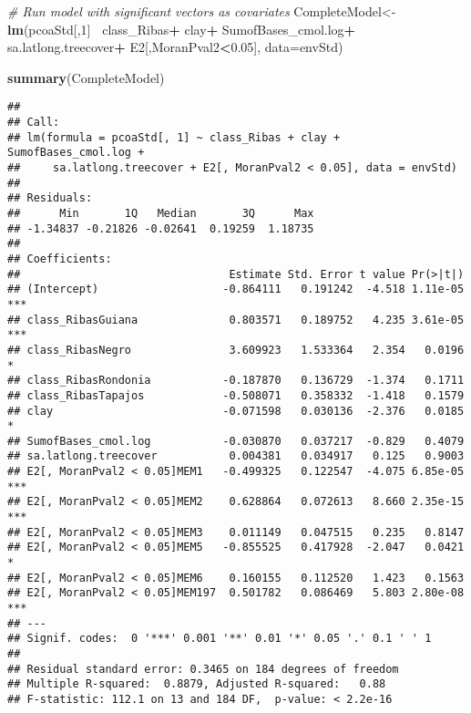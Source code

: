 \documentclass[]{article}
\newenvironment{Shaded}{\begin{snugshade}}{\end{snugshade}}
\newcommand{\CommentTok}[1]{\textcolor[rgb]{0.56,0.35,0.01}{\textit{#1}}}
\newcommand{\DataTypeTok}[1]{\textcolor[rgb]{0.13,0.29,0.53}{#1}}
\newcommand{\DecValTok}[1]{\textcolor[rgb]{0.00,0.00,0.81}{#1}}
\newcommand{\FloatTok}[1]{\textcolor[rgb]{0.00,0.00,0.81}{#1}}
\newcommand{\KeywordTok}[1]{\textcolor[rgb]{0.13,0.29,0.53}{\textbf{#1}}}
\newcommand{\NormalTok}[1]{#1}
\newcommand{\OperatorTok}[1]{\textcolor[rgb]{0.81,0.36,0.00}{\textbf{#1}}}
\newcommand{\StringTok}[1]{\textcolor[rgb]{0.31,0.60,0.02}{#1}}
\begin{document}
\begin{Shaded}
\begin{Highlighting}[]
\CommentTok{# Run model with significant vectors as covariates}
\NormalTok{CompleteModel<-}\KeywordTok{lm}\NormalTok{(pcoaStd[,}\DecValTok{1}\NormalTok{]}\OperatorTok{~}
\StringTok{                    }\NormalTok{class_Ribas}\OperatorTok{+}
\StringTok{                    }\NormalTok{clay}\OperatorTok{+}
\StringTok{                    }\NormalTok{SumofBases_cmol.log}\OperatorTok{+}
\StringTok{                    }\NormalTok{sa.latlong.treecover}\OperatorTok{+}
\StringTok{                    }\NormalTok{E2[,MoranPval2}\OperatorTok{<}\FloatTok{0.05}\NormalTok{],}
                  \DataTypeTok{data=}\NormalTok{envStd)}

\KeywordTok{summary}\NormalTok{(CompleteModel)}
\end{Highlighting}
\end{Shaded}

\begin{verbatim}
## 
## Call:
## lm(formula = pcoaStd[, 1] ~ class_Ribas + clay + SumofBases_cmol.log + 
##     sa.latlong.treecover + E2[, MoranPval2 < 0.05], data = envStd)
## 
## Residuals:
##      Min       1Q   Median       3Q      Max 
## -1.34837 -0.21826 -0.02641  0.19259  1.18735 
## 
## Coefficients:
##                                Estimate Std. Error t value Pr(>|t|)    
## (Intercept)                   -0.864111   0.191242  -4.518 1.11e-05 ***
## class_RibasGuiana              0.803571   0.189752   4.235 3.61e-05 ***
## class_RibasNegro               3.609923   1.533364   2.354   0.0196 *  
## class_RibasRondonia           -0.187870   0.136729  -1.374   0.1711    
## class_RibasTapajos            -0.508071   0.358332  -1.418   0.1579    
## clay                          -0.071598   0.030136  -2.376   0.0185 *  
## SumofBases_cmol.log           -0.030870   0.037217  -0.829   0.4079    
## sa.latlong.treecover           0.004381   0.034917   0.125   0.9003    
## E2[, MoranPval2 < 0.05]MEM1   -0.499325   0.122547  -4.075 6.85e-05 ***
## E2[, MoranPval2 < 0.05]MEM2    0.628864   0.072613   8.660 2.35e-15 ***
## E2[, MoranPval2 < 0.05]MEM3    0.011149   0.047515   0.235   0.8147    
## E2[, MoranPval2 < 0.05]MEM5   -0.855525   0.417928  -2.047   0.0421 *  
## E2[, MoranPval2 < 0.05]MEM6    0.160155   0.112520   1.423   0.1563    
## E2[, MoranPval2 < 0.05]MEM197  0.501782   0.086469   5.803 2.80e-08 ***
## ---
## Signif. codes:  0 '***' 0.001 '**' 0.01 '*' 0.05 '.' 0.1 ' ' 1
## 
## Residual standard error: 0.3465 on 184 degrees of freedom
## Multiple R-squared:  0.8879, Adjusted R-squared:   0.88 
## F-statistic: 112.1 on 13 and 184 DF,  p-value: < 2.2e-16
\end{verbatim}
\end{document}
